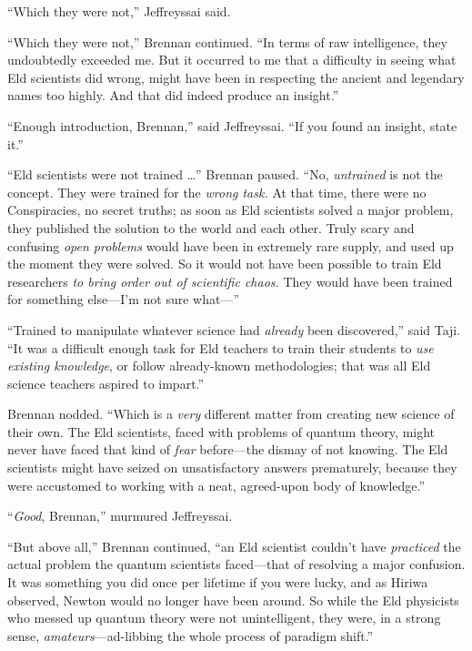 {
 ``Which they were not,''
Jeffreyssai said.}

{
 ``Which they were not,''
Brennan continued. ``In terms of raw intelligence,
they undoubtedly exceeded me. But it occurred to me that a difficulty
in seeing what Eld scientists did wrong, might have been in respecting
the ancient and legendary names too highly. And that did indeed produce
an insight.''}

{
 ``Enough introduction,
Brennan,'' said Jeffreyssai. ``If
you found an insight, state it.''}

{
 ``Eld scientists were not trained
\ldots'' Brennan paused. ``No,
\textit{untrained} is not the concept. They were trained for the
\textit{wrong task.} At that time, there were no Conspiracies, no
secret truths; as soon as Eld scientists solved a major problem, they
published the solution to the world and each other. Truly scary and
confusing \textit{open problems} would have been in extremely rare
supply, and used up the moment they were solved. So it would not have
been possible to train Eld researchers \textit{to bring order out of
scientific chaos.} They would have been trained for something
else---I'm not sure what---''}

{
 ``Trained to manipulate whatever science had
\textit{already} been discovered,'' said Taji.
``It was a difficult enough task for Eld teachers to
train their students to \textit{use existing knowledge}, or follow
already-known methodologies; that was all Eld science teachers aspired
to impart.''}

{
 Brennan nodded. ``Which is a \textit{very}
different matter from creating new science of their own. The Eld
scientists, faced with problems of quantum theory, might never have
faced that kind of \textit{fear} before---the dismay of not knowing.
The Eld scientists might have seized on unsatisfactory answers
prematurely, because they were accustomed to working with a neat,
agreed-upon body of knowledge.''}

{
 ``\textit{Good}, Brennan,''
murmured Jeffreyssai.}

{
 ``But above all,'' Brennan
continued, ``an Eld scientist couldn't
have \textit{practiced} the actual problem the quantum scientists
faced---that of resolving a major confusion. It was something you did
once per lifetime if you were lucky, and as Hiriwa observed, Newton
would no longer have been around. So while the Eld physicists who
messed up quantum theory were not unintelligent, they were, in a strong
sense, \textit{amateurs}{}---ad-libbing the whole process of paradigm
shift.''}

